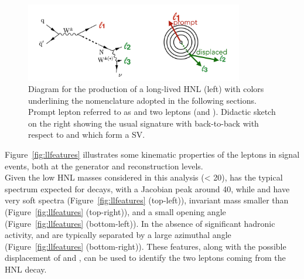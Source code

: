 \begin{figure}[h]
\centering
\includegraphics[width=0.85\textwidth]{Figures/c6/llsketch}
\caption{Diagram for the production of a long-lived HNL (left) with colors
  underlining the nomenclature adopted in the following
  sections. Prompt lepton referred to as \lone and two \displ leptons (\ltwo and \lthree). Didactic sketch on the right showing the usual signature with
 \lone back-to-back with respect to \ltwo and \lthree which form a SV.}
\label{fig:c6llsketch}
\end{figure}



Figure~\ref{fig:llfeatures} illustrates some
kinematic properties of the leptons in signal events, both at the
generator and reconstruction levels.\\
Given the low HNL masses considered in this analysis (\mhnl < 20\GeV),
\lone has the typical \pt spectrum expected for \PW decays, with a
Jacobian peak around 40\GeV,
while \ltwo and \lthree have very soft \pt spectra
(Figure~\ref{fig:llfeatures} (top-left)), invariant mass smaller than
\mhnl (Figure~\ref{fig:llfeatures} (top-right)), and a small opening angle
(Figure~\ref{fig:llfeatures} (bottom-left)).
In the absence of significant hadronic activity, \lone and \hnl are
typically separated by a large azimuthal angle
(Figure~\ref{fig:llfeatures} (bottom-right)).
These features, along with the possible displacement of \ltwo and
\lthree, can be used to identify the two leptons coming from the HNL
decay.

